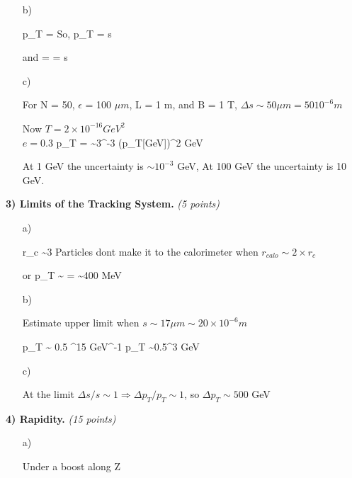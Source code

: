 {\begin{itemize}
{}
\item[b)]{
\be
p_T = 
\ee 
So,
\be
\Delta p_T =  \Delta s 
\ee 

and
\be
{} =  =  \Delta s 
\ee 

}
\item[c)]{
For N = 50, $\epsilon$ = 100 $\mu m$, L = 1 m, and B = 1 T, $\Delta s \sim 50 \mu m = 50 10^{-6} m$

Now
$T = 2 \times 10^{-16} GeV^2$\\
$e = 0.3$
\be
\Delta p_T =    \sim 3^{-3} (p_T[GeV])^2 GeV
\ee

At 1 GeV the uncertainty is $\sim 10^{-3}$ GeV,   At 100 GeV the uncertainty is 10 GeV.
}
\end{itemize}

\vspace*{0.25in}

\textbf{3) Limits of the Tracking System.} \hfill \textit{(5 points)}\\

\begin{itemize}
\item[a)]{
\be
r_c \sim 3 
\ee
Particles dont make it to the calorimeter when $r_{calo} \sim 2\times r_c$

or 
\be
p_T \sim {} =  \sim 400 MeV
\ee

}

\item[b)]{
Estimate upper limit when $s\sim17 \mu m \sim 20 \times 10^{-6} m$

\be
p_T \sim {}  0.5  ^{15} GeV^{-1}
p_T \sim 0.5^3 GeV
\ee

}
\item[c)]{
At the limit $\Delta s / s \sim 1  \Rightarrow \Delta p_T / p_T \sim 1 $, so $\Delta p_T \sim 500$ GeV


}
\end{itemize}

\vspace*{0.25in}

\textbf{4) Rapidity.} \hfill \textit{(15 points)}\\

\begin{itemize}
\item[a)]{
Under a boost along Z

}
\end{itemize}}
